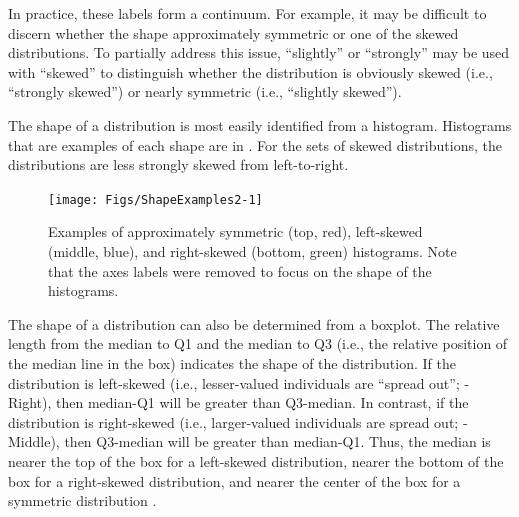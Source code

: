 \documentclass[10pt,openany]{book}\usepackage[]{graphicx}\usepackage[]{color}
\newenvironment{knitrout}{}{} %
\begin{document}

In practice, these labels form a continuum. For example, it may be difficult to discern whether the shape approximately symmetric or one of the skewed distributions. To partially address this issue, ``slightly'' or ``strongly'' may be used with ``skewed'' to distinguish whether the distribution is obviously skewed (i.e., ``strongly skewed'') or nearly symmetric (i.e., ``slightly skewed'').


The shape of a distribution is most easily identified from a histogram. Histograms that are examples of each shape are in . For the sets of skewed distributions, the distributions are less strongly skewed from left-to-right.

\begin{knitrout}
\color{fgcolor}\begin{figure}[hbtp]

{\centering \texttt{[image: Figs/ShapeExamples2-1]} 

}

\caption[Examples of approximately symmetric (top, red), left-skewed (middle, blue), and right-skewed (bottom, green) histograms]{Examples of approximately symmetric (top, red), left-skewed (middle, blue), and right-skewed (bottom, green) histograms. Note that the axes labels were removed to focus on the shape of the histograms.}\label{fig:ShapeExamples2}
\end{figure}


\end{knitrout}

The shape of a distribution can also be determined from a boxplot. The relative length from the median to Q1 and the median to Q3 (i.e., the relative position of the median line in the box) indicates the shape of the distribution. If the distribution is left-skewed (i.e., lesser-valued individuals are ``spread out''; -Right), then median-Q1 will be greater than Q3-median. In contrast, if the distribution is right-skewed (i.e., larger-valued individuals are spread out; -Middle), then Q3-median will be greater than median-Q1. Thus, the median is nearer the top of the box for a left-skewed distribution, nearer the bottom of the box for a right-skewed distribution, and nearer the center of the box for a symmetric distribution .
\end{document}

